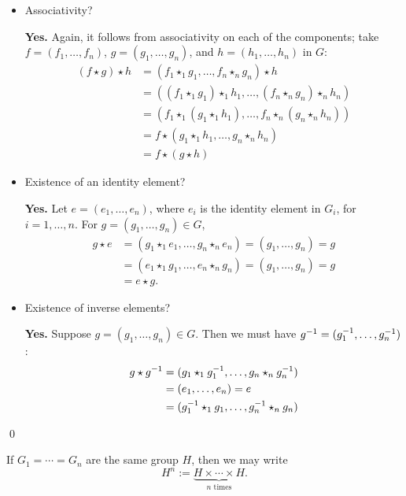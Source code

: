 \documentclass[../UNABRIDGEDalgebraNotesMSRI-UP2016.tex]{subfiles}
\begin{document}
\begin{frame}
\begin{itemize}
\item Associativity?

\textbf{Yes.}  Again, it follows from associativity on each of the components; take $f=(f_1,\dots,f_n)$, $g=(g_1,\dots,g_n)$, and $h=(h_1,\dots,h_n)$ in $G$:
\begin{align*}
(f\star g)\star h &= (f_1\star_1g_1,\dots,f_n\star_ng_n)\star h \\
	&= \left((f_1\star_1 g_1)\star_1 h_1,\dots,(f_n\star_n g_n)\star_n h_n\right) \\
	&=\left(f_1\star_1(g_1\star_1 h_1),\dots,f_n\star_n(g_n\star_n h_n)\right) \\
	&=f\star(g_1\star_1 h_1,\dots,g_n\star_n h_n) \\
	&=f\star (g\star h)
\end{align*}

\item Existence of an identity element?

\textbf{Yes.} Let $e=(e_1,\dots,e_n)$, where $e_i$ is the identity element in $G_i$, for $i=1,\dots,n$.  For $g=(g_1,\dots,g_n)\in G$,
\begin{align*}
g\star e &= (g_1\star_1 e_1,\dots,g_n\star_n e_n) =(g_1,\dots,g_n)=g \\
	&= (e_1\star_1 g_1,\dots, e_n\star_n g_n) = (g_1,\dots, g_n)=g \\
	&= e\star g.
\end{align*}
\end{itemize}
\end{frame}

\begin{frame}
\begin{itemize}
\item Existence of inverse elements?

\textbf{Yes.} Suppose $g=(g_1,\dots,g_n)\in G$.  Then we must have $g^{-1}=(g_1^{-1},\dots,g_n^{-1})$:
\begin{align*}
g\star g^{-1} &=(g_1\star_1 g_1^{-1},\dots,g_n\star_n g_n^{-1}) \\
	&= (e_1,\dots,e_n)=e \\
	&= (g_1^{-1}\star_1 g_1,\dots,g_n^{-1}\star_n g_n)
\end{align*}
\end{itemize}
\qed 

\smallGap
If $G_1=\cdots =G_n$ are the same group $H$, then we may write 
\[
H^n:=\underbrace{H\times \cdots \times H}_{\text{$n$ times}}. 
\]
\end{frame}
\end{document}
